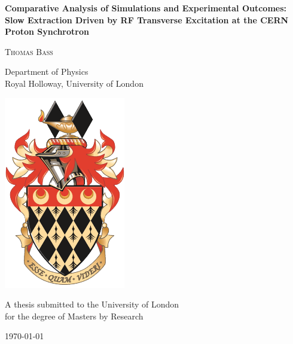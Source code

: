 \begin{titlepage}

\center

\vspace*{0.1cm}

\begin{spacing}{2}

{ \LARGE \bfseries Comparative Analysis of Simulations and Experimental Outcomes: Slow Extraction Driven by RF Transverse Excitation at the CERN Proton Synchrotron}\\[0.4cm] 


\vspace{0.7cm}

\textsc{\Large Thomas Bass}\\[0.5cm]

\end{spacing}
\begin{spacing}{1.5}
{\Large Department of Physics\\
Royal Holloway, University of London}\\[1.5cm]
\end{spacing}

\includegraphics[width=0.35\linewidth]{Royal_Holloway_coat_of_arms.png}\\[1cm] %
\begin{spacing}{1.5}
\begin{center}
    {\Large A thesis submitted to the University of London\\for the degree of Masters by Research}\\[1cm]
\end{center}
\vspace{1cm}
{\large \today}
\end{spacing}


\end{titlepage}

